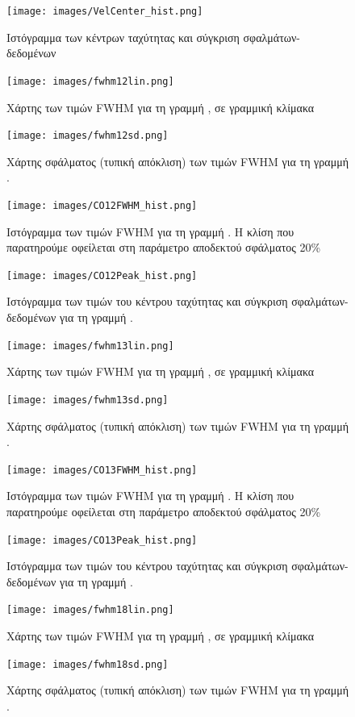 \documentclass[a4paper,12pt]{memoir}
\begin{document}
\begin{figure}[h!]
	\centering
	\texttt{[image: images/VelCenter\_hist.png]}
	\caption{Ιστόγραμμα των κέντρων ταχύτητας και σύγκριση σφαλμάτων-δεδομένων}
\end{figure}


\begin{figure}[h!]
	\centering
	\texttt{[image: images/fwhm12lin.png]}
	\caption{Χάρτης των τιμών FWHM για τη γραμμή , σε γραμμική κλίμακα}
	
	\centering
	\texttt{[image: images/fwhm12sd.png]}
	\caption{Χάρτης σφάλματος (τυπική απόκλιση) των τιμών FWHM για τη γραμμή .}
\end{figure}

\begin{figure}[h!]
	\centering
	\texttt{[image: images/CO12FWHM\_hist.png]}
	\caption{Ιστόγραμμα των τιμών FWHM για τη γραμμή . Η κλίση που παρατηρούμε οφείλεται στη παράμετρο αποδεκτού σφάλματος 20\%}
	
	\centering
	\texttt{[image: images/CO12Peak\_hist.png]}
	\caption{Ιστόγραμμα των τιμών του κέντρου ταχύτητας και σύγκριση σφαλμάτων-δεδομένων για τη γραμμή .}
\end{figure}

\begin{figure}[h!]
	\centering
	\texttt{[image: images/fwhm13lin.png]}
	\caption{Χάρτης των τιμών FWHM για τη γραμμή , σε γραμμική κλίμακα}
	
	\centering
	\texttt{[image: images/fwhm13sd.png]}
	\caption{Χάρτης σφάλματος (τυπική απόκλιση) των τιμών FWHM για τη γραμμή .}
\end{figure}

\begin{figure}[h!]
	\centering
	\texttt{[image: images/CO13FWHM\_hist.png]}
	\caption{Ιστόγραμμα των τιμών FWHM για τη γραμμή . Η κλίση που παρατηρούμε οφείλεται στη παράμετρο αποδεκτού σφάλματος 20\%}
	
	\centering
	\texttt{[image: images/CO13Peak\_hist.png]}
	\caption{Ιστόγραμμα των τιμών του κέντρου ταχύτητας και σύγκριση σφαλμάτων-δεδομένων για τη γραμμή .}
\end{figure}


\begin{figure}[h!]
	\centering
	\texttt{[image: images/fwhm18lin.png]}
	\caption{Χάρτης των τιμών FWHM για τη γραμμή , σε γραμμική κλίμακα}
	
	\centering
	\texttt{[image: images/fwhm18sd.png]}
	\caption{Χάρτης σφάλματος (τυπική απόκλιση) των τιμών FWHM για τη γραμμή .}
\end{figure}
\end{document}
